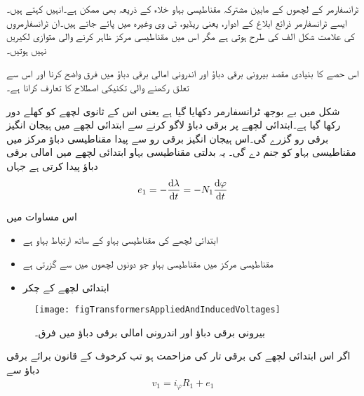 ٹرانسفارمر کے لچھوں کے مابین مشترکہ مقناطیسی بہاو خلاء کے ذریعہ بھی ممکن ہے۔انہیں   کہتے ہیں۔ ایسے ٹرانسفارمر ذرائع ابلاغ کے ادوار، یعنی ریڈیو، ٹی وی وغیرہ میں پائے جاتے ہیں۔ان ٹرانسفارمروں کی علامت  شکل  الف کی طرح ہوتی ہے مگر اس میں مقناطیسی مرکز ظاہر کرنے والی متوازی لکیریں نہیں ہوتیں۔

اس حصے کا بنیادی مقصد بیرونی برقی دباؤ   اور اندرونی امالی برقی دباؤ   میں فرق واضح کرنا اور اس سے تعلق رکھنے والی تکنیکی اصطلاح کا تعارف کرانا ہے۔

شکل   میں بے بوجھ ٹرانسفارمر دکھایا گیا ہے یعنی اس کے ثانوی لچھے کو کھلے دور رکھا گیا ہے۔ابتدائی لچھے پر  برقی دباؤ لاگو کرنے سے ابتدائی لچھے میں ہیجان انگیز برقی رو  گزرے گی۔اس ہیجان انگیز برقی رو سے پیدا مقناطیسی دباؤ   مرکز میں مقناطیسی بہاو   کو جنم دے گی۔ یہ بدلتی مقناطیسی بہاو ابتدائی لچھے میں امالی برقی  دباؤ   پیدا کرتی ہے جہاں
\begin{align}
e_1=-\frac{\dif \lambda}{\dif t}=-N_1 \frac{\dif \varphi}{\dif t}
\end{align}

 اس مساوات میں
\begin{itemize}
\item
{} ابتدائی لچھے کی مقناطیسی بہاو کے ساتھ ارتباط بہاو ہے
\item
{} مقناطیسی مرکز میں مقناطیسی بہاو جو دونوں لچھوں میں سے گزرتی ہے
\item
{} ابتدائی لچھے کے چکر
\end{itemize}
%
\begin{figure}
\centering
\texttt{[image: figTransformersAppliedAndInducedVoltages]}
\caption{بیرونی برقی دباؤ اور اندرونی امالی برقی دباؤ میں فرق۔}
\label{شکل_ٹرانسفارمر_بیرونی_اور_اندرونی_برقی_دباؤ}
\end{figure}

اگر اس ابتدائی لچھے کی برقی تار کی مزاحمت  ہو تب کرخوف کے قانون برائے برقی دباؤ سے
\begin{align}\label{مساوات_ٹرانسفارمر_بیرونی_اندرونی_دباؤ_فرق}
v_1 = i_{\varphi} R_1+e_1
\end{align}

